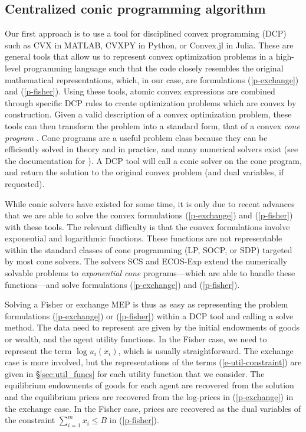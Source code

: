 \documentclass[12pt]{article}
\begin{document}
\subsection{Centralized conic programming algorithm}
\label{sec:centralized}

Our first approach is to use a tool for disciplined convex programming (DCP)
\cite{GBY:06,Grant2004} such as CVX \cite{cvx} in MATLAB, CVXPY \cite{cvxpy} in
Python, or Convex.jl \cite{convex.jl} in Julia. These are general tools that
allow us to represent convex optimization problems in a high-level programming
language such that the code closely resembles the original mathematical
representations, which, in our case, are formulations (\ref{p-exchange}) and
(\ref{p-fisher}). Using these tools, atomic convex expressions are combined
through specific DCP rules to create optimization problems which are convex by
construction. Given a valid description of a convex optimization problem, these
tools can then transform the problem into a standard form, that of a convex
\emph{cone program} \cite{nn.ip}. Cone programs are a useful problem class
because they can be efficiently solved in theory and in practice,
and many numerical solvers exist (see the
documentation for \cite{cvx,cvxpy,convex.jl}). A DCP tool
will call a conic solver on the cone program, and return the solution
to the original convex problem (and dual variables, if requested).

While conic solvers have existed for some time, it is only due to recent
advances \cite{scs,ecos-exp} that we are able to solve the convex formulations
(\ref{p-exchange}) and (\ref{p-fisher}) with these tools. The relevant
difficulty is that the convex formulations involve exponential and logarithmic
functions. These functions are not representable within the standard classes of
cone programming (LP, SOCP, or SDP) targeted by most cone solvers. The solvers
SCS \cite{scs} and ECOS-Exp \cite{ecos-exp} extend the numerically solvable
problems to \emph{exponential cone} programs---which are able to handle these
functions---and solve formulations (\ref{p-exchange}) and (\ref{p-fisher}).

Solving a Fisher or exchange MEP is thus as easy as representing the problem
formulations (\ref{p-exchange}) or (\ref{p-fisher}) within a DCP tool and
calling a solve method. The data need to represent are given by the initial
endowments of goods or wealth, and the agent utility functions. In the Fisher
case, we need to represent the term $\log u_i(x_i)$, which is usually
straightforward. The exchange case is more involved, but the representations of
the terms (\ref{e-util-constraint}) are given in \S\ref{sec:util_funcs} for
each utility function that we consider. The equilibrium endowments of goods for
each agent are recovered from the solution and the equilibrium prices are recovered
from the log-prices in (\ref{p-exchange}) in the exchange case. In the Fisher
case, prices are recovered as the dual variables of the constraint $\sum_{i=1}^m
x_i \leq B$ in (\ref{p-fisher}).
\end{document}
